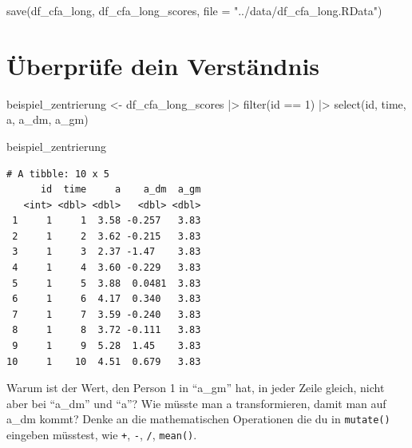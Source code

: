 \documentclass[
  letterpaper,
  DIV=11,
  numbers=noendperiod]{scrreprt}
\newenvironment{Shaded}{\begin{snugshade}}{\end{snugshade}}
\newcommand{\AttributeTok}[1]{\textcolor[rgb]{0.40,0.45,0.13}{#1}}
\newcommand{\DecValTok}[1]{\textcolor[rgb]{0.68,0.00,0.00}{#1}}
\newcommand{\FunctionTok}[1]{\textcolor[rgb]{0.28,0.35,0.67}{#1}}
\newcommand{\NormalTok}[1]{\textcolor[rgb]{0.00,0.23,0.31}{#1}}
\newcommand{\OtherTok}[1]{\textcolor[rgb]{0.00,0.23,0.31}{#1}}
\newcommand{\SpecialCharTok}[1]{\textcolor[rgb]{0.37,0.37,0.37}{#1}}
\newcommand{\StringTok}[1]{\textcolor[rgb]{0.13,0.47,0.30}{#1}}
\begin{document}
\begin{Shaded}
\begin{Highlighting}[]
\FunctionTok{save}\NormalTok{(df\_cfa\_long, df\_cfa\_long\_scores, }\AttributeTok{file =} \StringTok{"../data/df\_cfa\_long.RData"}\NormalTok{)}
\end{Highlighting}
\end{Shaded}

\section{Überprüfe dein
Verständnis}\label{uxfcberpruxfcfe-dein-verstuxe4ndnis}

\begin{Shaded}
\begin{Highlighting}[]
\NormalTok{beispiel\_zentrierung }\OtherTok{\textless{}{-}}\NormalTok{ df\_cfa\_long\_scores }\SpecialCharTok{|\textgreater{}} 
  \FunctionTok{filter}\NormalTok{(id }\SpecialCharTok{==} \DecValTok{1}\NormalTok{) }\SpecialCharTok{|\textgreater{}} 
  \FunctionTok{select}\NormalTok{(id, time, a, a\_dm, a\_gm)}

\NormalTok{beispiel\_zentrierung}
\end{Highlighting}
\end{Shaded}

\begin{verbatim}
# A tibble: 10 x 5
      id  time     a    a_dm  a_gm
   <int> <dbl> <dbl>   <dbl> <dbl>
 1     1     1  3.58 -0.257   3.83
 2     1     2  3.62 -0.215   3.83
 3     1     3  2.37 -1.47    3.83
 4     1     4  3.60 -0.229   3.83
 5     1     5  3.88  0.0481  3.83
 6     1     6  4.17  0.340   3.83
 7     1     7  3.59 -0.240   3.83
 8     1     8  3.72 -0.111   3.83
 9     1     9  5.28  1.45    3.83
10     1    10  4.51  0.679   3.83
\end{verbatim}

Warum ist der Wert, den Person 1 in ``a\_gm'' hat, in jeder Zeile
gleich, nicht aber bei ``a\_dm'' und ``a''? Wie müsste man a
transformieren, damit man auf a\_dm kommt? Denke an die mathematischen
Operationen die du in \texttt{mutate()} eingeben müsstest, wie
\texttt{+}, \texttt{-}, \texttt{/}, \texttt{mean()}.
\end{document}
